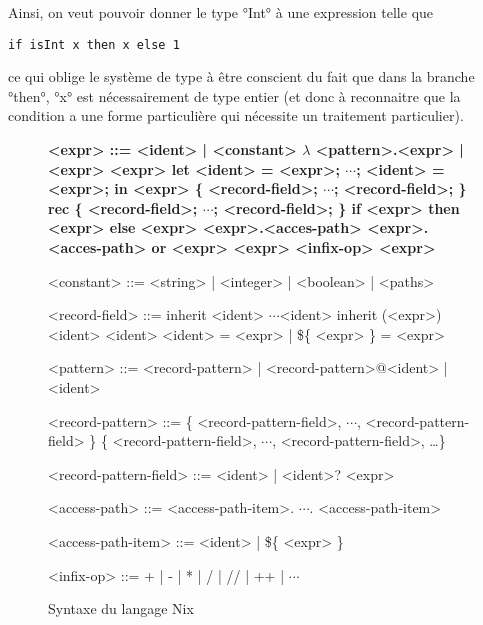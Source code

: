 Ainsi, on veut pouvoir donner le type °Int° à une expression telle que

\begin{lstlisting}
if isInt x then x else 1
\end{lstlisting}

ce qui oblige le système de type à être conscient du fait que dans la branche
°then°, °x° est nécessairement de type entier (et donc à reconnaitre que la
condition a une forme particulière qui nécessite un traitement particulier).

\begin{figure}
  \def\dots{$\cdots$}
  \begin{grammar}
    \bfseries
    <expr> ::=
    <ident> | <constant>
    \alt $\lambda$ <pattern>.<expr> | <expr> <expr>
    \alt let <ident> = <expr>; \dots; <ident> = <expr>; in <expr>
    \alt [ <expr> \dots <expr> ]
    \alt \{ <record-field>; \dots; <record-field>; \}
    \alt rec \{ <record-field>; \dots; <record-field>; \}
    \alt if <expr> then <expr> else <expr>
    \alt <expr>.<acces-path>
    \alt <expr>.<acces-path> or <expr>
    \alt <expr> <infix-op> <expr>

    <constant> ::= <string> | <integer> | <boolean> | <paths>

    <record-field> ::= inherit <ident> \dots <ident>
    \alt inherit (<expr>) <ident> <ident>
    \alt <ident> = <expr> | \$\{ <expr> \} = <expr>

    <pattern> ::= <record-pattern> | <record-pattern>@<ident> | <ident>

    <record-pattern> ::= \{ <record-pattern-field>, \dots, <record-pattern-field> \}
    \alt \{ <record-pattern-field>, \dots, <record-pattern-field>, \ldots \}

    <record-pattern-field> ::= <ident> | <ident>? <expr>

    <access-path> ::= <access-path-item>. \dots . <access-path-item>

    <access-path-item> ::= <ident> | \$\{ <expr> \}

    <infix-op> ::= + | - | * | / | // | ++ | \dots
  \end{grammar}
  \caption{Syntaxe du langage Nix\label{nix::syntax}}
\end{figure}


